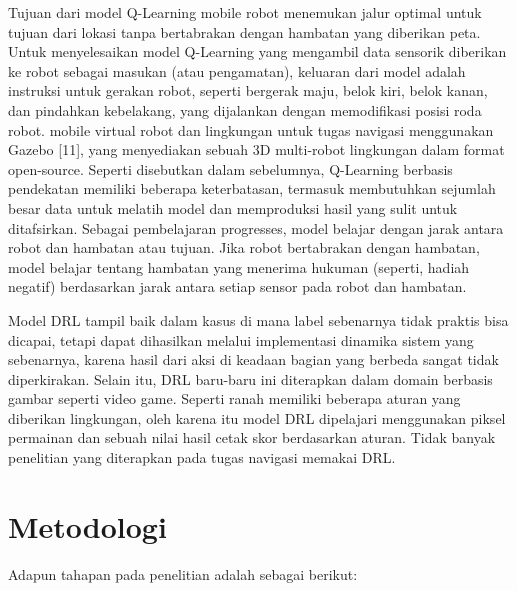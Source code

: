 Tujuan dari model Q-Learning mobile robot menemukan jalur optimal untuk tujuan dari  lokasi tanpa bertabrakan dengan hambatan yang diberikan peta. Untuk menyelesaikan model Q-Learning yang mengambil data sensorik diberikan ke robot sebagai masukan (atau pengamatan), keluaran dari model adalah instruksi untuk gerakan robot, seperti bergerak maju, belok kiri, belok kanan, dan pindahkan kebelakang, yang dijalankan dengan memodifikasi posisi roda robot. mobile virtual robot dan lingkungan untuk tugas navigasi menggunakan Gazebo [11], yang menyediakan sebuah 3D multi-robot lingkungan dalam format open-source. Seperti disebutkan dalam sebelumnya, Q-Learning berbasis pendekatan memiliki beberapa keterbatasan, termasuk membutuhkan sejumlah besar data untuk melatih model dan memproduksi hasil yang sulit untuk ditafsirkan. Sebagai pembelajaran progresses, model belajar dengan jarak antara robot dan hambatan atau tujuan. Jika robot bertabrakan dengan hambatan, model belajar tentang hambatan yang menerima hukuman (seperti, hadiah negatif) berdasarkan jarak antara setiap sensor pada robot dan hambatan.

Model DRL tampil baik dalam kasus di mana label sebenarnya tidak praktis bisa dicapai, tetapi dapat dihasilkan melalui implementasi dinamika sistem yang sebenarnya, karena hasil dari aksi di keadaan bagian yang berbeda sangat tidak diperkirakan. Selain itu, DRL baru-baru ini diterapkan dalam domain berbasis gambar seperti video game. Seperti ranah memiliki beberapa aturan yang diberikan lingkungan, oleh karena itu model DRL dipelajari menggunakan piksel permainan dan sebuah nilai hasil cetak skor berdasarkan aturan. Tidak banyak penelitian yang diterapkan pada tugas navigasi memakai DRL. 

\section{Metodologi}

Adapun tahapan pada penelitian adalah sebagai berikut:

